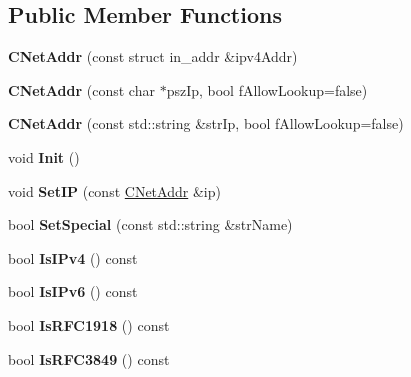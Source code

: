 \subsection*{Public Member Functions}
\begin{DoxyCompactItemize}
\item 
\mbox{\label{class_c_net_addr_a0af492cd8aca9bbaa3392cdbfbb55681}} 
{\bfseries C\+Net\+Addr} (const struct in\+\_\+addr \&ipv4\+Addr)
\item 
\mbox{\label{class_c_net_addr_a3549332f92d95ccadf262bdce9f4eacf}} 
{\bfseries C\+Net\+Addr} (const char $\ast$psz\+Ip, bool f\+Allow\+Lookup=false)
\item 
\mbox{\label{class_c_net_addr_ae237602be0e4bce6ff31061270371144}} 
{\bfseries C\+Net\+Addr} (const std\+::string \&str\+Ip, bool f\+Allow\+Lookup=false)
\item 
\mbox{\label{class_c_net_addr_adab412fbc5a9203bea90ae173996ab10}} 
void {\bfseries Init} ()
\item 
\mbox{\label{class_c_net_addr_a1c6087345e5ca07a151451cd6deb974f}} 
void {\bfseries Set\+IP} (const \mbox{\hyperlink{class_c_net_addr}{C\+Net\+Addr}} \&ip)
\item 
\mbox{\label{class_c_net_addr_aa3e44dfd064d9d8da1cb48cdcb7dd231}} 
bool {\bfseries Set\+Special} (const std\+::string \&str\+Name)
\item 
\mbox{\label{class_c_net_addr_a7021b79e9a33c342b68db09dbb6c2293}} 
bool {\bfseries Is\+I\+Pv4} () const
\item 
\mbox{\label{class_c_net_addr_aad5f7a372c56ccf4d773f728b6b46e18}} 
bool {\bfseries Is\+I\+Pv6} () const
\item 
\mbox{\label{class_c_net_addr_a6c6d7376d8d0ae4c7cb0893add58069f}} 
bool {\bfseries Is\+R\+F\+C1918} () const
\item 
\mbox{\label{class_c_net_addr_a7bf8bc283323c0cd9be42f921469c90f}} 
bool {\bfseries Is\+R\+F\+C3849} () const

\end{DoxyCompactItemize}
